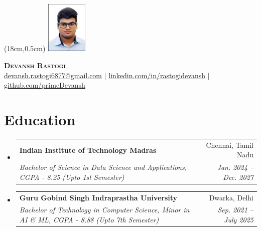\documentclass[letterpaper,9pt]{article}
\makeatletter
\newcommand{\resumeSubheading}[4]{
  \vspace{-2pt}\item
    \begin{tabular*}{0.97\textwidth}[t]{l@{\extracolsep{\fill}}r}
      \textbf{#1} & #2 \\
      \textit{\small#3} & \textit{\small #4} \\
    \end{tabular*}\vspace{-7pt}
}
\newcommand{\resumeSubHeadingListStart}{\begin{itemize}[leftmargin=0.15in, label={}]}
\newcommand{\resumeSubHeadingListEnd}{\end{itemize}}
\makeatother
\begin{document}
\begin{textblock*}{2cm}(18cm,0.5cm) %
  \includegraphics[width=2cm,height=2.5cm,keepaspectratio]{photo.jpg}
\end{textblock*}
\begin{center}
    \textbf{\Huge \scshape Devansh Rastogi} \\ \vspace{10pt}
    \small \href{mailto:dvcam.rastogi1980@gmail.com}{\underline{devansh.rastogi6877@gmail.com}} $|$ 
    \href{https://linkedin.com/in/rastogidevansh}{\underline{linkedin.com/in/rastogidevansh}} $|$
    \href{https://github.com/primeDevansh}{\underline{github.com/primeDevansh}}
\end{center}

\section{Education}
  \resumeSubHeadingListStart
    \resumeSubheading
      {Indian Institute of Technology Madras}{Chennai, Tamil Nadu}
      {Bachelor of Science in Data Science and Applications, CGPA - 8.25 (Upto 1st Semester)}{Jan. 2024 -- Dec. 2027}
    \resumeSubheading
      {Guru Gobind Singh Indraprastha University}{Dwarka, Delhi}
      {Bachelor of Technology in Computer Science, Minor in AI \& ML, CGPA - 8.88 (Upto 7th Semester)}{Sep. 2021 -- July 2025}
  \resumeSubHeadingListEnd

\end{document}
